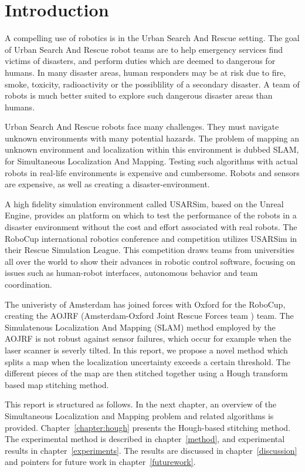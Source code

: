 \chapter{Introduction}
\label{chapter:introduction}
A compelling use of robotics is in the Urban Search And Rescue setting. The goal of Urban Search And Rescue robot teams are to help emergency services find victims of disasters, and perform duties which are deemed to dangerous for humans. In many disaster areas, human responders may be at risk due to fire, smoke, toxicity, radioactivity or the possiblility of a secondary disaster. A team of robots is much better suited to explore such dangerous disaster areas than humans. 

Urban Search And Rescue robots face many challenges. They must navigate unknown environments with many potential hazards. The problem of mapping an unknown environment and localization within this environment is dubbed SLAM, for Simultaneous Localization And Mapping. Testing such algorithms with actual robots in real-life environments is expensive and cumbersome. Robots and sensors are expensive, as well as creating a disaster-environment. 

A high fidelity simulation environment called USARSim, based on the Unreal Engine, provides an platform on which to test the performance of the robots in a disaster environment without the cost and effort associated with real robots. The RoboCup international robotics conference and competition utilizes USARSim in their Rescue Simulation League. This competition draws teams from universities all over the world to show their advances in robotic control software, focusing on issues such as human-robot interfaces, autonomous behavior and team coordination.

The univeristy of Amsterdam has joined forces with Oxford for the RoboCup, creating the AOJRF (Amsterdam-Oxford Joint Rescue Forces team \cite{aojrf2011}) team. The Simulatenous Localization And Mapping (SLAM) method employed by the AOJRF is not robust against sensor failures, which occur for example when the laser scanner is severly tilted.  In this report, we propose a novel method which splits a map when the localization uncertainty exceeds a certain threshold. The different pieces of the map are then stitched together using a Hough transform based map stitching method.

This report is structured as follows. In the next chapter, an overview of the Simultaneous Localization and Mapping problem and related algorithms is provided. Chapter~\ref{chapter:hough} presents the Hough-based stitching method. The experimental method is described in chapter~\ref{method}, and experimental results in chapter~\ref{experiments}. The results are discussed in chapter~\ref{discussion} and pointers for future work in chapter~\ref{futurework}.